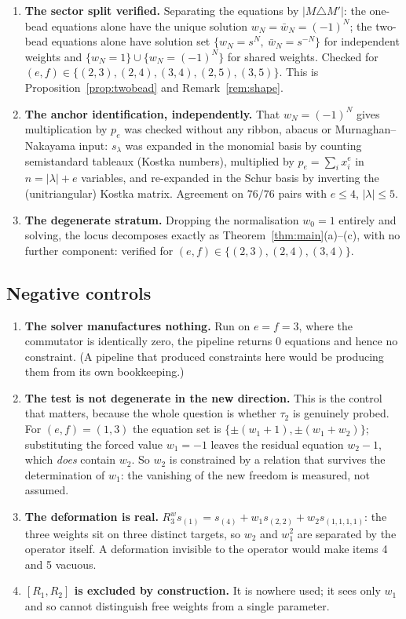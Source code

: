 \documentclass[11pt]{article}
\theoremstyle{definition}
\begin{document}
\begin{enumerate}
\item \textbf{The sector split verified.}  Separating the equations by
  $|M\triangle M'|$: the one-bead equations alone have the unique solution
  $w_N=\bar w_N=(-1)^N$; the two-bead equations alone have solution set
  $\{w_N=s^N,\ \bar w_N=s^{-N}\}$ for independent weights and
  $\{w_N=1\}\cup\{w_N=(-1)^N\}$ for shared weights.  Checked for
  $(e,f)\in\{(2,3),(2,4),(3,4),(2,5),(3,5)\}$.  This is
  Proposition~\ref{prop:twobead} and Remark~\ref{rem:shape}.

\item \textbf{The anchor identification, independently.}  That $w_N=(-1)^N$ gives
  multiplication by $p_e$ was checked without any ribbon, abacus or
  Murnaghan--Nakayama input: $s_\lambda$ was expanded in the monomial basis by counting
  semistandard tableaux (Kostka numbers), multiplied by $p_e=\sum_ix_i^e$ in
  $n=|\lambda|+e$ variables, and re-expanded in the Schur basis by inverting the
  (unitriangular) Kostka matrix.  Agreement on $76/76$ pairs with $e\le4$,
  $|\lambda|\le5$.

\item \textbf{The degenerate stratum.}  Dropping the normalisation $w_0=1$ entirely and
  solving, the locus decomposes exactly as Theorem~\ref{thm:main}(a)--(c), with no
  further component: verified for $(e,f)\in\{(2,3),(2,4),(3,4)\}$.
\end{enumerate}

\subsection*{Negative controls}

\begin{enumerate}
\item[(N1)] \textbf{The solver manufactures nothing.}  Run on $e=f=3$, where the
  commutator is identically zero, the pipeline returns $0$ equations and hence no
  constraint.  (A pipeline that produced constraints here would be producing them from
  its own bookkeeping.)
\item[(N2)] \textbf{The test is not degenerate in the new direction.}  This is the
  control that matters, because the whole question is whether $\tau_2$ is genuinely
  probed.  For $(e,f)=(1,3)$ the equation set is $\{\pm(w_1+1),\pm(w_1+w_2)\}$;
  substituting the forced value $w_1=-1$ leaves the residual equation $w_2-1$, which
  \emph{does} contain $w_2$.  So $w_2$ is constrained by a relation that survives the
  determination of $w_1$: the vanishing of the new freedom is measured, not assumed.
\item[(N3)] \textbf{The deformation is real.}  $R_3^{w}s_{(1)}=s_{(4)}+w_1s_{(2,2)}
  +w_2s_{(1,1,1,1)}$: the three weights sit on three distinct targets, so $w_2$ and
  $w_1^2$ are separated by the operator itself.  A deformation invisible to the operator
  would make items 4 and 5 vacuous.
\item[(N4)] \textbf{$[R_1,R_2]$ is excluded by construction.}  It is nowhere used;
  it sees only $w_1$ and so cannot distinguish free weights from a single parameter.
\end{enumerate}
\end{document}
